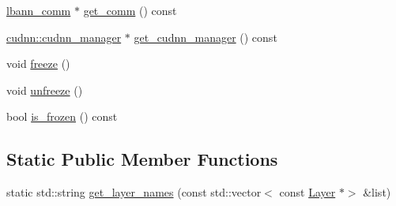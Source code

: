 \begin{DoxyCompactItemize}
\item 
\hyperlink{classlbann_1_1lbann__comm}{lbann\+\_\+comm} $\ast$ \hyperlink{classlbann_1_1Layer_a1b528e5872357a82176ee487596b363c}{get\+\_\+comm} () const
\item 
\hyperlink{classlbann_1_1cudnn_1_1cudnn__manager}{cudnn\+::cudnn\+\_\+manager} $\ast$ \hyperlink{classlbann_1_1Layer_a63c694744d9360208642a35412a4e8ee}{get\+\_\+cudnn\+\_\+manager} () const
\item 
void \hyperlink{classlbann_1_1Layer_ad55c455dbae0d082cedfa68511709aae}{freeze} ()
\item 
void \hyperlink{classlbann_1_1Layer_aa43ecf9fc67eb1d596c1a69cf35d1245}{unfreeze} ()
\item 
bool \hyperlink{classlbann_1_1Layer_af3c0f9f32eb631f4fdf34ad040ef8637}{is\+\_\+frozen} () const
\end{DoxyCompactItemize}
\subsection*{Static Public Member Functions}
\begin{DoxyCompactItemize}
\item 
static std\+::string \hyperlink{classlbann_1_1Layer_af4a093d91552cf079217eb346bbb847f}{get\+\_\+layer\+\_\+names} (const std\+::vector$<$ const \hyperlink{classlbann_1_1Layer}{Layer} $\ast$$>$ \&list)
\end{DoxyCompactItemize}
